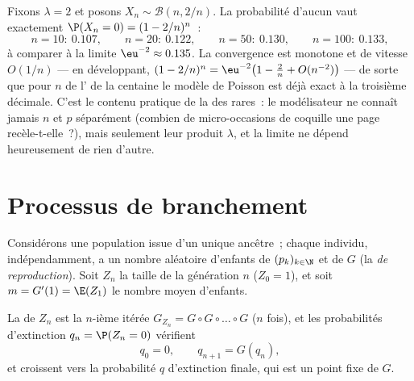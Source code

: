 \begin{example}\label{ex:b2:genfun:poissonnumerics}
Fixons $\lambda = 2$ et posons $X_n \sim \mathcal B(n, 2/n)$. La
probabilité d'aucun  vaut exactement $\P(X_n = 0) = (1 -
2/n)^n$~:
\[
n = 10:\ 0.107, \qquad
n = 20:\ 0.122, \qquad
n = 50:\ 0.130, \qquad
n = 100:\ 0.133,
\]
à comparer à la limite $\eu^{-2} \approx 0.135$. La convergence
est monotone et de vitesse $O(1/n)$ --- en développant, $(1 -
2/n)^n = \eu^{-2}\bigl(1 - \tfrac2n + O(n^{-2})\bigr)$ ---
de sorte que pour $n$ de l' de la centaine le modèle de Poisson
est déjà exact à la troisième décimale. C'est le contenu pratique
de la  des  rares~: le modélisateur ne connaît jamais $n$
et $p$ séparément (combien de micro-occasions de coquille une page
recèle-t-elle~?), mais seulement leur produit $\lambda$, et la
 limite ne dépend heureusement de rien d'autre.
\end{example}

\section{Processus de branchement}

Considérons une population issue d'un unique ancêtre~; chaque
individu, indépendamment, a un nombre aléatoire d'enfants de 
$(p_k)_{k \in \N}$ et de  $G$ (la \emph{ de
reproduction}). Soit $Z_n$ la taille de la génération $n$ ($Z_0 =
1$), et soit $m = G'(1) = \E(Z_1)$ le nombre moyen d'enfants.

\begin{proposition}\label{prop:b2:genfun:branching}
La  de $Z_n$ est la $n$-ième itérée
$G_{Z_n} = G \circ G \circ \dots \circ G$ ($n$ fois), et les
probabilités d'extinction $q_n = \P(Z_n = 0)$ vérifient
\[
q_0 = 0, \qquad q_{n+1} = G(q_n),
\]
et croissent vers la probabilité $q$ d'extinction finale, qui
est un point fixe de $G$.
\end{proposition}

